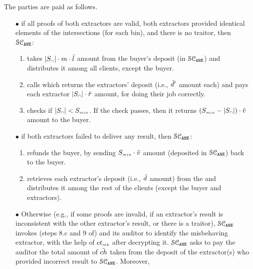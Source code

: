 



\item The parties are paid as follows. 

\begin{itemize}
%
\item[$\bullet$]  if all proofs of both extractors are valid, both extractors provided identical elements of the intersections (for each bin), and there is no traitor, then $\mathcal{SC}_{\mathtt{ANE}}$:
\begin{enumerate}
%
 \item takes $|S_{\scriptscriptstyle\cap}|\cdot m\cdot \ddot{l}$ amount from the buyer's deposit (in $\mathcal{SC}_{\mathtt{ANE}}$) and distributes it among all clients, except the buyer. 
 \item calls \SCpc which returns the extractors' deposit (i.e., $\ddot{d}'$ amount each) and pays each extractor $|S_{\scriptscriptstyle\cap}|\cdot \ddot{r}$ amount, for doing their job correctly. 
 \item checks if $|{ { {S}}}_{\scriptscriptstyle\cap}|<S_{\scriptscriptstyle min}$. If the check passes, then it returns $(S_{\scriptscriptstyle min}-|S_{\scriptscriptstyle\cap}|)\cdot \ddot{v}$ amount  to the buyer.
 \end{enumerate}
% 
\item[$\bullet$] if both extractors failed to deliver any result, then $\mathcal{SC}_{\mathtt{ANE}}$:
%
\begin{enumerate}
%
\item refunds the buyer, by sending $S_{\scriptscriptstyle min}\cdot \ddot{v}$ amount (deposited in $\mathcal{SC}_{\mathtt{ANE}}$) back to the buyer. 
%
\item retrieves each extractor's deposit (i.e., $\ddot{d}$ amount) from the \SCpc and distributes it among the rest of the clients (except the buyer and extractors).  
%
 \end{enumerate}
 \item[$\bullet$]\label{smart-PSI-inconsistency} Otherwise (e.g., if some proofs are invalid, if an extractor's result is inconsistent with the other extractor's result, or there is a traitor), $\mathcal{SC}_{\mathtt{ANE}}$ invokes (steps 8.c and 9 of) \SCpc and its auditor to identify the misbehaving extractor, with the help of $ct_{\scriptscriptstyle mk}$ after decrypting it. $\mathcal{SC}_{\mathtt{ANE}}$ asks \SCpc to pay the auditor the total amount of $\ddot{ch}$ taken from the deposit of the extractor(s) who provided incorrect result to $\mathcal{SC}_{\mathtt{ANE}}$. Moreover,
%


\end{itemize}
